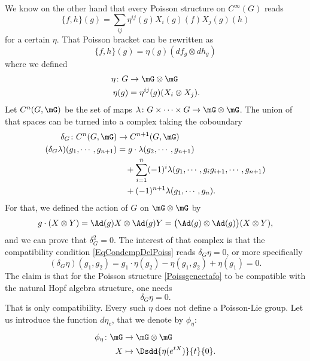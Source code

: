 We know on the other hand that every Poisson structure on $ C^{\infty}(G)$ reads
\begin{equation}	\label{Poissgeneetafo}
	\{ f,h \}(g)=\sum_{ij}\eta^{ij}(g)X_i(g)(f)X_j(g)(h)
\end{equation}
for a certain $\eta$. That Poisson bracket can be rewritten as
\begin{equation}
	\{ f,h \}(g)=\eta(g)(df_g\otimes dh_g)
\end{equation}
where we defined
\begin{equation}
	\begin{aligned}
		\eta\colon G & \to \mG\otimes\mG              \\
		\eta(g)      & =\eta^{ij}(g)(X_i\otimes X_j).
	\end{aligned}
\end{equation}
Let $C^n(G,\mG)$ be the set of maps $\lambda\colon G\times\cdots\times G\to \mG\otimes\mG$. The union of that spaces can be turned into a complex taking the coboundary
\begin{equation}
	\begin{aligned}
		\delta_G\colon C^n(G,\mG)             & \to C^{n+1}(G,\mG)                                                     \\
		(\delta_G\lambda)(g_1,\cdots,g_{n+1}) & =g\cdot \lambda(g_2,\cdots,g_{n+1})                                    \\
		                                      & \quad+\sum_{i=1}^n (-1)^i\lambda(g_1,\cdots,g_ig_{i+1},\cdots,g_{n+1}) \\
		                                      & \quad+(-1)^{n+1}\lambda(g_1,\cdots,g_n).
	\end{aligned}
\end{equation}
For that, we defined the action of $G$ on $\mG\otimes \mG$ by
\[
	g\cdot(X\otimes Y)=\Ad(g)X\otimes\Ad(g)Y=\big( \Ad(g)\otimes\Ad(g) \big)(X\otimes Y),
\]
and we can prove that $\delta_G^2=0$. The interest of that complex is that the compatibility condition \eqref{EqCondcmpDelPoiss} reads $\delta_G\eta=0$, or more specifically
\[
	(\delta_G\eta)(g_1,g_2)=g_1\cdot\eta(g_2)-\eta(g_1,g_2)+\eta(g_1)=0.
\]
The claim is that for the Poisson structure \eqref{Poissgeneetafo} to be compatible with the natural Hopf algebra structure, one needs
\begin{equation}
	\delta_G\eta=0.
\end{equation}
That is only compatibility. Every such $\eta$ does not define a Poisson-Lie group. Let us introduce the function $d\eta_e$, that we denote by $\phi_{\eta}$:
\begin{equation}
	\begin{aligned}
		\phi_{\eta}\colon \mG & \to \mG\otimes\mG                     \\
		X                     & \mapsto \Dsdd{ \eta( e^{tX}) }{t}{0}.
	\end{aligned}
\end{equation}

